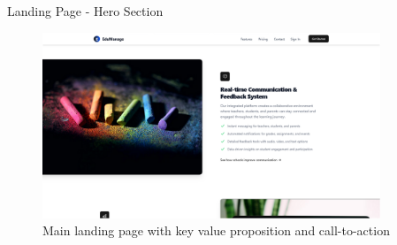 \documentclass[aspectratio=169]{beamer}
\begin{document}
\begin{frame}{Landing Page - Hero Section}
    \begin{figure}
        \includegraphics[width=0.9\textwidth,height=0.7\textheight,keepaspectratio]{../pfe-pics/landing/Screenshot 2025-06-09 at 23-12-17 Vite React TS.png}
        \caption{Main landing page with key value proposition and call-to-action}
    \end{figure}
\end{frame}
\end{document}
